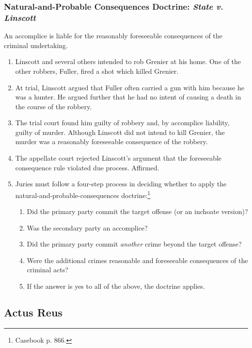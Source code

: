 \subsubsection{Natural-and-Probable Consequences Doctrine: \emph{State v. 
Linscott}}

An accomplice is liable for the reasonably foreseeable consequences of the 
criminal undertaking.

\begin{enumerate}
    \item Linscott and several others intended to rob Grenier at his home. One 
    of the other robbers, Fuller, fired a shot which killed Grenier.
    \item At trial, Linscott argued that Fuller often carried a gun with him 
    because he was a hunter. He argued further that he had no intent of 
    causing a death in the course of the robbery.
    \item The trial court found him guilty of robbery and, by accomplice 
    liability, guilty of murder. Although Linscott did not intend to kill 
    Grenier, the murder was a reasonably foreseeable consequence of the 
    robbery.
    \item The appellate court rejected Linscott's argument that the 
    foreseeable consequence rule violated due process. Affirmed.
    \item Juries must follow a four-step process in deciding whether to apply 
    the natural-and-probable-consequences doctrine:\footnote{Casebook p. 866.}
    \begin{enumerate}
        \item Did the primary party commit the target offense (or an inchoate 
        version)?
        \item Was the secondary party an accomplice? 
        \item Did the primary party commit \emph{another} crime beyond the 
        target offense?
        \item Were the additional crimes reasonable and foreseeable 
        consequences of the criminal acts?
        \item If the answer is yes to all of the above, the doctrine applies.
    \end{enumerate}
\end{enumerate}

\subsection{Actus Reus}

